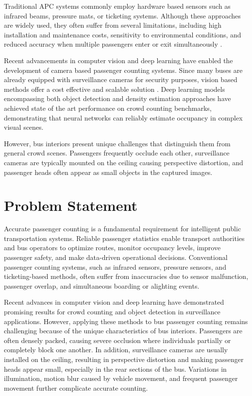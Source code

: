\documentclass[12pt,a4paper]{report}
\begin{document}
Traditional APC systems commonly employ hardware based sensors such as infrared beams, pressure mats, or ticketing systems. Although these approaches are widely used, they often suffer from several limitations, including high installation and maintenance costs, sensitivity to environmental conditions, and reduced accuracy when multiple passengers enter or exit simultaneously \cite{mccarthy2025video}.

Recent advancements in computer vision and deep learning have enabled the development of camera based passenger counting systems. Since many buses are already equipped with surveillance cameras for security purposes, vision based methods offer a cost effective and scalable solution \cite{McCarthy2023DeepLearning}. Deep learning models encompassing both object detection and density estimation approaches have achieved state of the art performance on crowd counting benchmarks, demonstrating that neural networks can reliably estimate occupancy in complex visual scenes.

However, bus interiors present unique challenges that distinguish them from general crowd scenes. Passengers frequently occlude each other, surveillance cameras are typically mounted on the ceiling causing perspective distortion, and passenger heads often appear as small objects in the captured images.

\section{Problem Statement}

Accurate passenger counting is a fundamental requirement for intelligent public transportation systems. Reliable passenger statistics enable transport authorities and bus operators to optimize routes, monitor occupancy levels, improve passenger safety, and make data-driven operational decisions. Conventional passenger counting systems, such as infrared sensors, pressure sensors, and ticketing-based methods, often suffer from inaccuracies due to sensor malfunction, passenger overlap, and simultaneous boarding or alighting events.

Recent advances in computer vision and deep learning have demonstrated promising results for crowd counting and object detection in surveillance applications. However, applying these methods to bus passenger counting remains challenging because of the unique characteristics of bus interiors. Passengers are often densely packed, causing severe occlusion where individuals partially or completely block one another. In addition, surveillance cameras are usually installed on the ceiling, resulting in perspective distortion and making passenger heads appear small, especially in the rear sections of the bus. Variations in illumination, motion blur caused by vehicle movement, and frequent passenger movement further complicate accurate counting.
\end{document}
